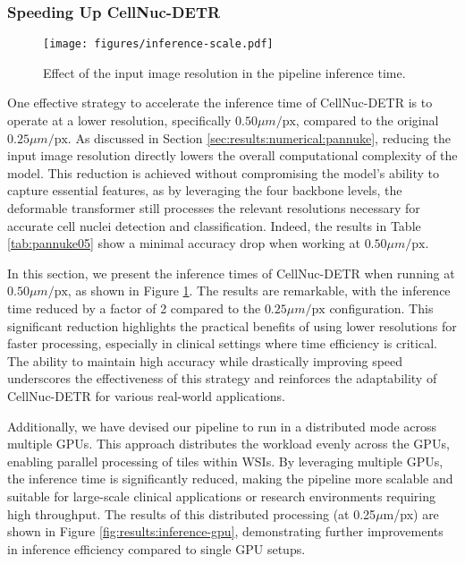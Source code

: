 \subsubsection{Speeding Up CellNuc-DETR}
\label{sec:results:time:scale}

\begin{figure}
    \centering
    \texttt{[image: figures/inference-scale.pdf]}
    \caption{Effect of the input image resolution in the pipeline inference time.}
    \label{fig:results:inference-scale}
\end{figure}

One effective strategy to accelerate the inference time of CellNuc-DETR is to operate at a lower resolution, specifically $0.50 \mu m/\text{px}$, compared to the original $0.25 \mu m/\text{px}$. As discussed in Section \ref{sec:results:numerical:pannuke}, reducing the input image resolution directly lowers the overall computational complexity of the model. This reduction is achieved without compromising the model’s ability to capture essential features, as by leveraging the four backbone levels, the deformable transformer still processes the relevant resolutions necessary for accurate cell nuclei detection and classification. Indeed, the results in Table \ref{tab:pannuke05} show a minimal accuracy drop when working at $0.50 \mu m/\text{px}$.

In this section, we present the inference times of CellNuc-DETR when running at $0.50 \mu m/\text{px}$, as shown in Figure \ref{fig:results:inference-scale}. The results are remarkable, with the inference time reduced by a factor of 2 compared to the $0.25 \mu m/\text{px}$ configuration. This significant reduction highlights the practical benefits of using lower resolutions for faster processing, especially in clinical settings where time efficiency is critical. The ability to maintain high accuracy while drastically improving speed underscores the effectiveness of this strategy and reinforces the adaptability of CellNuc-DETR for various real-world applications.

Additionally, we have devised our pipeline to run in a distributed mode across multiple GPUs. This approach distributes the workload evenly across the GPUs, enabling parallel processing of tiles within WSIs. By leveraging multiple GPUs, the inference time is significantly reduced, making the pipeline more scalable and suitable for large-scale clinical applications or research environments requiring high throughput. The results of this distributed processing (at 0.25$\mu$m/px) are shown in Figure \ref{fig:results:inference-gpu}, demonstrating further improvements in inference efficiency compared to single GPU setups.


